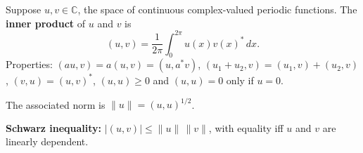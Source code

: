 Suppose $u, v \in \mathbb{C}$, the space of continuous complex-valued periodic functions. The \textbf{inner product} of $u$ and $v$ is
$$(u, v) = \frac{1}{2\pi} \int_0^{2\pi} u(x) v(x)^* \, dx.$$
Properties: $(au, v) = a(u,v) = (u, a^*v)$, $(u_1+u_2, v) = (u_1,v)+(u_2,v)$, $(v,u) = (u,v)^*$, $(u,u) \geq 0$ and $(u,u)=0$ only if $u=0$.

The associated norm is $\|u\| = (u,u)^{1/2}$.

\textbf{Schwarz inequality:} $|(u,v)| \leq \|u\| \, \|v\|$, with equality iff $u$ and $v$ are linearly dependent.
